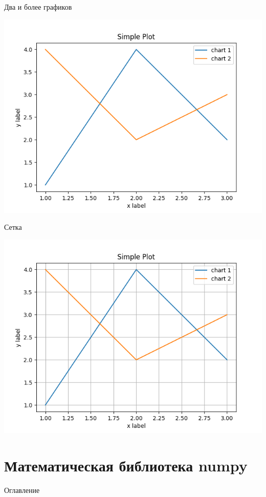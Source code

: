\documentclass[12pt]{beamer}
\begin{document}
\begin{frame}{Два и более графиков}

\vspace{0cm}
\includegraphics[scale=0.35]{code_04/43.png}
\end{frame}

\begin{frame}{Сетка}

\vspace{0cm}
\includegraphics[scale=0.35]{code_04/44.png}
\end{frame}


\section{Математическая библиотека numpy}
\begin{frame}[t]{Оглавление}
\tableofcontents[currentsection]
\end{frame}
\end{document}
